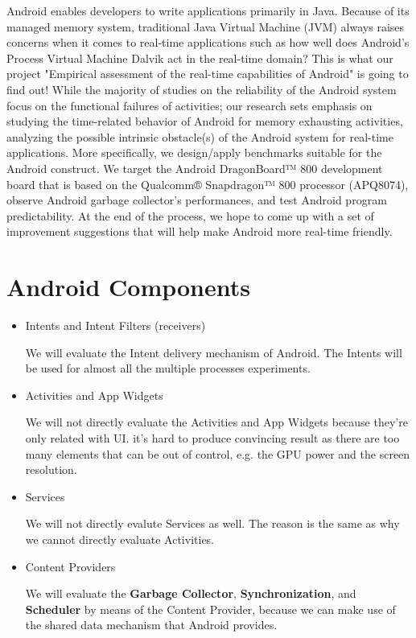 \documentclass[11pt]{article}
\begin{document}
Android enables developers to write applications primarily in Java.  Because of its managed memory system, traditional Java Virtual Machine (JVM) always raises concerns when it comes to real-time applications such as how well does Android’s Process Virtual Machine Dalvik act in the real-time domain? This is what our project "Empirical assessment of the real-time capabilities of Android" is going to find out! While the majority of studies on the reliability of the Android system focus on the functional failures of activities; our research sets emphasis on studying the time-related behavior of Android for memory exhausting activities, analyzing the possible intrinsic obstacle(s) of the Android system for real-time applications. More specifically, we design/apply benchmarks suitable for the Android construct.  We target the Android DragonBoard™ 800 development board that is based on the Qualcomm® Snapdragon™ 800 processor (APQ8074), observe Android garbage collector’s performances, and test Android program predictability. At the end of the process, we hope to come up with a set of improvement suggestions that will help make Android more real-time friendly.

\section{Android Components}
\label{sec-2}
\begin{itemize}
\item Intents and Intent Filters (receivers)

We will evaluate the Intent delivery mechanism of Android.
The Intents will be used for almost all the multiple processes experiments.

\item Activities and App Widgets

We will not directly evaluate the Activities and App Widgets because they're only related with UI.
it's hard to produce convincing result as there are too many elements that can be out of control,
e.g. the GPU power and the screen resolution.

\item Services

We will not directly evalute Services as well. The reason is the same as why we cannot directly evaluate Activities.

\item Content Providers

We will evaluate the \textbf{Garbage Collector}, \textbf{Synchronization}, and \textbf{Scheduler} by means of the Content Provider, because we can make use of the shared data mechanism that Android provides.
\end{itemize}
\end{document}
